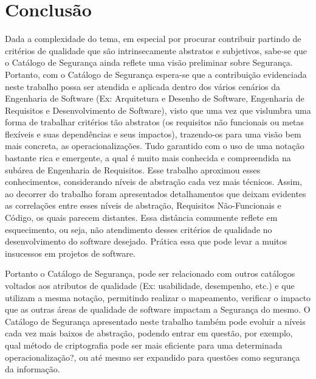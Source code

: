 \chapter{Conclusão}
\label{chap:consideracoesFinais}



Dada a complexidade do tema, em especial por procurar contribuir partindo de critérios de qualidade que são intrinsecamente abstratos e subjetivos, sabe-se que o Catálogo de Segurança ainda reflete uma visão preliminar sobre Segurança. Portanto, com o Catálogo de Segurança espera-se que a contribuição evidenciada neste trabalho possa ser atendida e aplicada dentro dos vários cenários da Engenharia de Software (Ex: Arquitetura e Desenho de Software, Engenharia de Requisitos e Desenvolvimento de Software), visto que uma vez que vislumbra uma forma de trabalhar critérios tão abstratos (os requisitos não funcionais ou metas flexíveis e suas dependências e seus impactos), trazendo-os para uma visão bem mais concreta, as operacionalizações. Tudo garantido com o uso de uma notação bastante rica e emergente, a qual é muito mais conhecida e compreendida na subárea de Engenharia de Requisitos. Esse trabalho aproximou esses conhecimentos, considerando níveis de abstração cada vez mais técnicos. Assim, ao decorrer do trabalho foram apresentados detalhamentos que deixam evidentes as correlações entre esses níveis de abstração, Requisitos Não-Funcionais e Código, os quais parecem distantes. Essa distância comumente reflete em esquecimento, ou seja, não atendimento desses critérios de qualidade no desenvolvimento do software desejado. Prática essa que pode levar a muitos insucessos em projetos de software. 

Portanto o Catálogo de Segurança, pode ser relacionado com outros catálogos voltados aos atributos de qualidade (Ex: usabilidade, desempenho, etc.) e que utilizam a mesma notação, permitindo realizar o mapeamento, verificar o impacto que as outras áreas de qualidade de software impactam a Segurança do mesmo. O Catálogo de Segurança apresentado neste trabalho também pode evoluir a níveis cada vez mais baixos de abstração, podendo entrar em questão, por exemplo, qual método de criptografia pode ser mais eficiente para uma determinada operacionalização?, ou até mesmo ser expandido para questões como segurança da informação.  


\begin{comment}
	Prática essa que pode levar a muitos insucessos, tais como o Caso da Ambulância de Londres \cite{finkelstein1996comedy}.
\end{comment}
 


